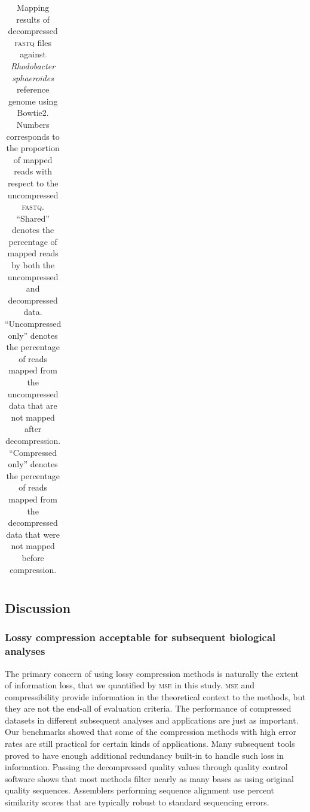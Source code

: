 \documentclass[12pt,\mydriver]{thesis}
\begin{document}
\begin{landscape}
\begin{table}[!tbhp]
\begin{tabular}{lr|cc|cc|cc|cc|cc}
\end{tabular}

\caption[Mapping results of decompressed \textsc{fastq} files
  against \textit{Rhodobacter sphaeroides} reference genome]{Mapping results of decompressed \textsc{fastq} files
  against \textit{Rhodobacter sphaeroides} reference genome using
  Bowtie2. Numbers corresponds to the proportion of mapped reads with
  respect to the uncompressed \textsc{fastq}. ``Shared'' denotes the
  percentage of mapped reads by both the uncompressed and decompressed
  data. ``Uncompressed only'' denotes the percentage of reads mapped
  from the uncompressed data that are not mapped after
  decompression. ``Compressed only'' denotes the percentage of reads
  mapped from the decompressed data that were not mapped before
  compression.}

\label{tab:aligner}
\end{table}

\renewcommand{\baselinestretch}{2}
\small\normalsize
\end{landscape}


\subsection{Discussion}

\subsubsection{Lossy compression acceptable for subsequent biological analyses}

The primary concern of using lossy compression methods is naturally
the extent of information loss, that we quantified by \textsc{mse} in
this study. \textsc{mse} and compressibility provide information in
the theoretical context to the methods, but they are not the end-all
of evaluation criteria. The performance of compressed datasets in
different subsequent analyses and applications are just as
important. Our benchmarks showed that some of the compression methods
with high error rates are still practical for certain kinds of
applications. Many subsequent tools proved to have enough additional
redundancy built-in to handle such loss in information. Passing the
decompressed quality values through quality control software shows
that most methods filter nearly as many bases as using original
quality sequences. Assemblers performing sequence alignment use
percent similarity scores that are typically robust to standard
sequencing errors.
\end{document}
